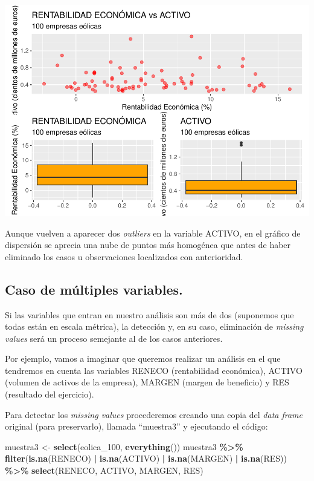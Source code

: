 \documentclass[
]{book}
\newenvironment{Shaded}{\begin{snugshade}}{\end{snugshade}}
\newcommand{\FunctionTok}[1]{\textcolor[rgb]{0.13,0.29,0.53}{\textbf{#1}}}
\newcommand{\NormalTok}[1]{#1}
\newcommand{\OtherTok}[1]{\textcolor[rgb]{0.56,0.35,0.01}{#1}}
\newcommand{\SpecialCharTok}[1]{\textcolor[rgb]{0.81,0.36,0.00}{\textbf{#1}}}
\let\Oldincludegraphics\includegraphics
\renewcommand{\includegraphics}[2][]{%
  \Oldincludegraphics[#1]{#2}%
}
\begin{document}
\includegraphics{_main_files/figure-latex/unnamed-chunk-185-1.pdf}

Aunque vuelven a aparecer dos \emph{outliers} en la variable ACTIVO, en el gráfico de dispersión se aprecia una nube de puntos más homogénea que antes de haber eliminado los casos u observaciones localizados con anterioridad.

\subsection{Caso de múltiples variables.}\label{caso-de-muxfaltiples-variables.}

Si las variables que entran en nuestro análisis son más de dos (suponemos que todas están en escala métrica), la detección y, en su caso, eliminación de \emph{missing values} será un proceso semejante al de los casos anteriores.

Por ejemplo, vamos a imaginar que queremos realizar un análisis en el que tendremos en cuenta las variables RENECO (rentabilidad económica), ACTIVO (volumen de activos de la empresa), MARGEN (margen de beneficio) y RES (resultado del ejercicio).

Para detectar los \emph{missing values} procederemos creando una copia del \emph{data frame} original (para preservarlo), llamada ``muestra3'' y ejecutando el código:

\begin{Shaded}
\begin{Highlighting}[]
\NormalTok{muestra3 }\OtherTok{\textless{}{-}} \FunctionTok{select}\NormalTok{(eolica\_100, }\FunctionTok{everything}\NormalTok{())}
\NormalTok{muestra3 }\SpecialCharTok{\%\textgreater{}\%} \FunctionTok{filter}\NormalTok{(}\FunctionTok{is.na}\NormalTok{(RENECO) }\SpecialCharTok{|}
                      \FunctionTok{is.na}\NormalTok{(ACTIVO) }\SpecialCharTok{|}
                      \FunctionTok{is.na}\NormalTok{(MARGEN) }\SpecialCharTok{|}
                      \FunctionTok{is.na}\NormalTok{(RES)) }\SpecialCharTok{\%\textgreater{}\%}
  \FunctionTok{select}\NormalTok{(RENECO, ACTIVO, MARGEN, RES)}
\end{Highlighting}
\end{Shaded}
\end{document}
